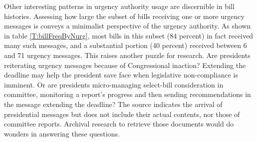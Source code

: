 \documentclass[letter,12pt]{article}
\begin{document}
Other interesting patterns in urgency authority usage are discernible in bill histories. Assessing how large the subset of bills receiving one or more urgency messages is conveys a minimalist perspective of the urgency authority. As shown in table \ref{T:billFreqByNurg}, most bills in this subset (84 percent) in fact received many such messages, and a substantial portion (40 percent) received between 6 and 71 urgency messages. This raises another puzzle for research. Are presidents reiterating urgency messages because of Congressional inaction? Extending the deadline may help the president save face when legislative non-compliance is imminent. Or are presidents micro-managing select-bill consideration in committee, monitoring a report's progress and then sending recommendations in the message extending the deadline? The source indicates the arrival of presidential messages but does not include their actual contents, nor those of committee reports. Archival research to retrieve those documents would do wonders in answering these questions. 

\end{document}
